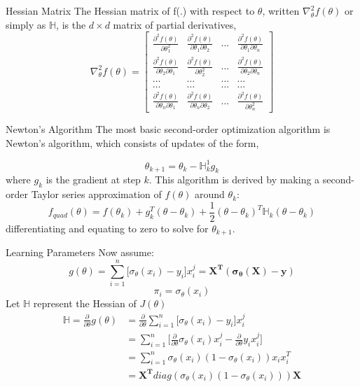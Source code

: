 \documentclass{beamer}
\begin{document}
\begin{frame}{Hessian Matrix}
The Hessian matrix of f(.) with respect to $\theta$, written $\nabla _{\theta}^{2}f(\theta)$ or simply as $\mathbb{H}$, is the $d \times d$ matrix of partial derivatives,
\begin{equation*}
\nabla _{\theta}^{2}f(\theta) = \begin{bmatrix} \frac{\partial^{2}f(\theta)}{\partial \theta_{1}^{2}} & \frac{\partial^{2}f(\theta)}{\partial \theta_{1}\partial \theta_{2}} & \ldots & \frac{\partial^{2}f(\theta)}{\partial \theta_{1}\partial \theta_{n}} \\ \frac{\partial^{2}f(\theta)}{\partial \theta_{2}\partial \theta_{1}} & \frac{\partial^{2}f(\theta)}{\partial \theta_{2}^{2}} & \ldots & \frac{\partial^{2}f(\theta)}{\partial \theta_{2}\partial \theta_{n}} \\ \ldots & \ldots & \ldots & \ldots \\ \ldots & \ldots & \ldots & \ldots \\ \frac{\partial^{2}f(\theta)}{\partial \theta_{n} \partial \theta_{1}} & \frac{\partial^{2}f(\theta)}{\partial \theta_{n}\partial \theta_{2}} & \ldots & \frac{\partial^{2}f(\theta)}{\partial \theta_{n}^{2}}\end{bmatrix}
\end{equation*}

\end{frame}
\begin{frame}{Newton's Algorithm}
The most basic second-order optimization algorithm is Newton's algorithm, which consists of updates of the form,

$$\theta_{k+1} = \theta_{k} - \mathbb{H}_{k}^{1}g_{k}$$
where $g_{k}$ is the gradient at step $k$. This algorithm is derived by making a second-order Taylor series approximation of $f(\theta)$ around $\theta_{k}$:
$$f_{quad}(\theta) = f(\theta_{k}) + g_{k}^{T}(\theta - \theta_{k}) + \frac{1}{2}(\theta - \theta_{k})^{T}\mathbb{H}_{k}(\theta - \theta_{k})$$
differentiating and equating to zero to solve for $\theta_{k+1}$.
\end{frame}
\begin{frame}{Learning Parameters}
Now assume:
$$g(\theta) = \sum_{i=1}^{n}\bigg[\sigma_{\theta}(x_{i}) - y_{i}\bigg]x_{i}^{j} = \mathbf{X^{T}(\sigma_{\theta}(X) - y)}$$
$$\pi_{i} = \sigma_{\theta}(x_{i})$$
Let $\mathbb{H}$ represent the Hessian of $J(\theta)$
\begin{align*}
\mathbb{H} = \frac{\partial}{\partial \theta} g(\theta) &= \frac{\partial}{\partial \theta} \sum_{i=1}^{n} \bigg[\sigma_{\theta}(x_{i}) - y_{i}\bigg]x_{i}^{j} \\
&= \sum_{i=1}^{n} \bigg[\frac{\partial}{\partial \theta}\sigma_{\theta}(x_{i})x_{i}^{j} - \frac{\partial}{\partial \theta} y_{i}x_{i}^{j}\bigg] \\
&= \sum_{i=1}^{n} \sigma_{\theta}(x_{i}) (1 - \sigma_{\theta}(x_{i}))x_{i}x_{i}^{T} \\
&= \mathbf{X^{T}}diag(\sigma_{\theta}(x_{i}) (1 - \sigma_{\theta}(x_{i})))\mathbf{X}
\end{align*}
\end{frame}
\end{document}
